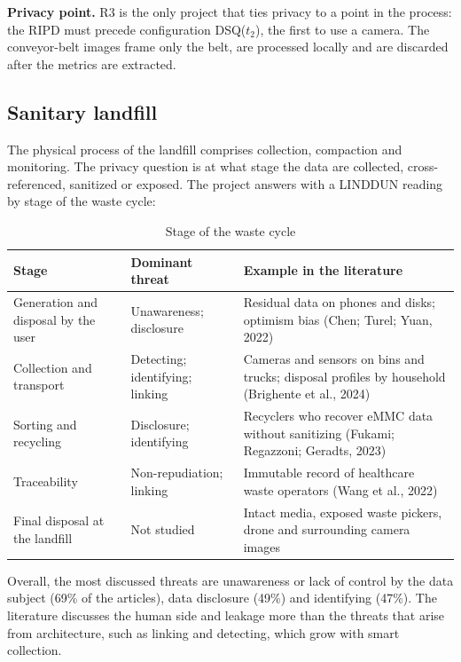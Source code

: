 \documentclass[12pt,a4paper,article,oneside,brazil,english]{abntex2}
\newcommand{\fontetab}[1]{\par\vspace{3pt}{\small\noindent Source: #1\par}}
\newcommand{\dsq}[1]{DSQ($t_{#1}$)}
\begin{document}
\textbf{Privacy point.} R3 is the only project that ties privacy to a point in the process: the RIPD must precede configuration \dsq{2}, the first to use a camera. The conveyor-belt images frame only the belt, are processed locally and are discarded after the metrics are extracted.

\subsection{Sanitary landfill}

The physical process of the landfill comprises collection, compaction and monitoring. The privacy question is at what stage the data are collected, cross-referenced, sanitized or exposed. The project answers with a LINDDUN reading by stage of the waste cycle:

\begin{table}[!htbp]
\centering
\caption{Stage of the waste cycle}
\label{tab:etapas}
\small
\begin{tabularx}{\linewidth}{>{\raggedright\arraybackslash}p{3.4cm} >{\raggedright\arraybackslash}p{3.4cm} Y}
\hline
\textbf{Stage} & \textbf{Dominant threat} & \textbf{Example in the literature}\\
\hline
Generation and disposal by the user & Unawareness; disclosure & Residual data on phones and disks; optimism bias (Chen; Turel; Yuan, 2022)\\
Collection and transport & Detecting; identifying; linking & Cameras and sensors on bins and trucks; disposal profiles by household (Brighente et al., 2024)\\
Sorting and recycling & Disclosure; identifying & Recyclers who recover eMMC data without sanitizing (Fukami; Regazzoni; Geradts, 2023)\\
Traceability & Non-repudiation; linking & Immutable record of healthcare waste operators (Wang et al., 2022)\\
Final disposal at the landfill & Not studied & Intact media, exposed waste pickers, drone and surrounding camera images\\
\hline
\end{tabularx}
\fontetab{Prepared by the author (2026).}
\end{table}

Overall, the most discussed threats are unawareness or lack of control by the data subject (69\% of the articles), data disclosure (49\%) and identifying (47\%). The literature discusses the human side and leakage more than the threats that arise from architecture, such as linking and detecting, which grow with smart collection.
\end{document}
